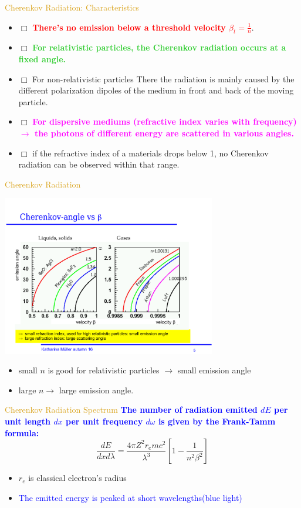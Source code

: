 \documentclass[11pt]{beamer} %
\renewcommand{\(}{\begin{columns}}
\renewcommand{\)}{\end{columns}}
\newcommand{\<}[1]{\begin{column}{#1}}
\renewcommand{\>}{\end{column}}
\newcommand{\itt}{\begin{itemize}}
\newcommand{\tti}{\end{itemize}}
\newcommand{\hlt}[2]{\textcolor{#1}{\textbf{#2}}}
\begin{document}
\begin{frame}{\textcolor{Goldenrod}{Cherenkov Radiation:
      Characteristics}}
  \itt
\item[$\Box$] \hlt{Red}{There's no emission below a threshold velocity
    $\beta_t = \frac{1}{n}$}.
\item[$\Box$] \hlt{LimeGreen}{For relativistic particles, the
    Cherenkov radiation occurs at a fixed angle.}
\item[$\Box$] For non-relativistic particles There the radiation is
  mainly caused by the different polarization dipoles of the medium in
  front and back of the moving particle.
\item[$\Box$] \hlt{Magenta}{For dispersive mediums (refractive index
    varies with frequency) $\to$ the photons of different energy are
    scattered in various angles.}
\item[$\Box$] if the refractive index of a materials drops below 1, no
  Cherenkov radiation can be observed within that range.
  \tti
\end{frame}
\begin{frame}{\textcolor{Goldenrod}{Cherenkov Radiation}}
  \begin{center}
    \includegraphics[width=0.7\textwidth, height=0.4\textheight]{./Images/cherenkov_angle_vs_beta}
  \end{center}
  \itt
\item small $n$ is good for relativistic particles $\to$ small
  emission angle
\item large $n \to $ large emission angle.
  \tti
\end{frame}

\begin{frame}{\textcolor{Goldenrod}{Cherenkov Radiation Spectrum}}
 \hlt{Blue}{The number of radiation emitted $dE$ per unit length $dx$ per unit
 frequency $d\omega $ is  given by the Frank-Tamm formula:}
 \[
   \frac{dE}{dx d\lambda} =  \frac{4\pi Z^2 r_e mc^2}{\lambda^3}[ 1 -
   \frac{1}{n^2\beta^2}] 
 \]
 \itt
\item $r_e$ is classical electron's radius
\item \textcolor{blue}{The emitted energy is peaked at short wavelengths(blue light)}
  \tti
\end{frame}
\end{document}
